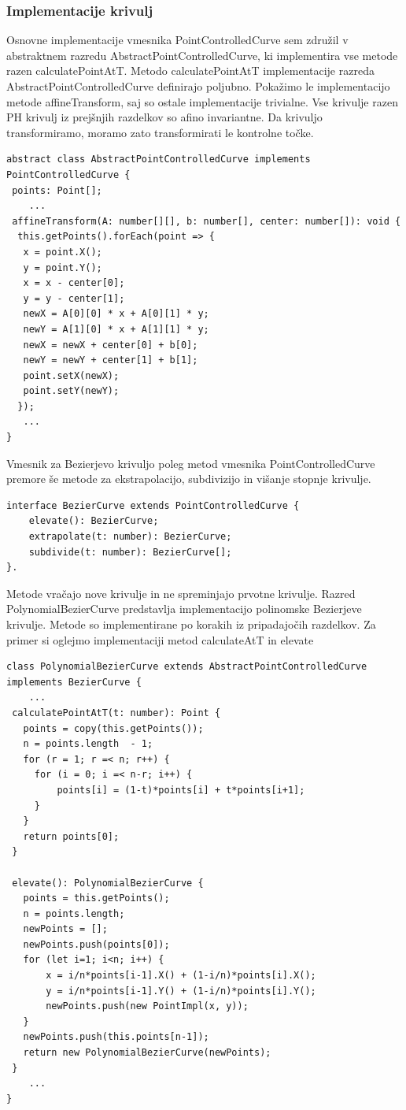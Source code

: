 \documentclass[isrm2, tisk]{fmfdelo}
\begin{document}
    \subsubsection{Implementacije krivulj}
    Osnovne implementacije vmesnika PointControlledCurve sem združil v abstraktnem razredu AbstractPointControlledCurve, ki implementira vse metode razen calculatePointAtT\@.
    Metodo calculatePointAtT implementacije razreda AbstractPointControlledCurve definirajo poljubno.
    Pokažimo le implementacijo metode affineTransform, saj so ostale implementacije trivialne.
    Vse krivulje razen PH krivulj iz prejšnjih razdelkov so afino invariantne.
    Da krivuljo transformiramo, moramo zato transformirati le kontrolne točke.
    \begin{lstlisting}[label={lst:affine-transform}]
abstract class AbstractPointControlledCurve implements PointControlledCurve {
 points: Point[];
    ...
 affineTransform(A: number[][], b: number[], center: number[]): void {
  this.getPoints().forEach(point => {
   x = point.X();
   y = point.Y();
   x = x - center[0];
   y = y - center[1];
   newX = A[0][0] * x + A[0][1] * y;
   newY = A[1][0] * x + A[1][1] * y;
   newX = newX + center[0] + b[0];
   newY = newY + center[1] + b[1];
   point.setX(newX);
   point.setY(newY);
  });
   ...
}
    \end{lstlisting}
    Vmesnik za Bezierjevo krivuljo poleg metod vmesnika PointControlledCurve premore še metode za ekstrapolacijo, subdivizijo in višanje stopnje krivulje.
    \begin{lstlisting}[label={lst:bez-curve-vmesnik}]
interface BezierCurve extends PointControlledCurve {
    elevate(): BezierCurve;
    extrapolate(t: number): BezierCurve;
    subdivide(t: number): BezierCurve[];
}.
    \end{lstlisting}
    Metode vračajo nove krivulje in ne spreminjajo prvotne krivulje.
    Razred PolynomialBezierCurve predstavlja implementacijo polinomske Bezierjeve krivulje.
    Metode so implementirane po korakih iz pripadajočih razdelkov.
    Za primer si oglejmo implementaciji metod calculateAtT in elevate
    \begin{lstlisting}[label={lst:bez-curve}]
class PolynomialBezierCurve extends AbstractPointControlledCurve implements BezierCurve {
    ...
 calculatePointAtT(t: number): Point {
   points = copy(this.getPoints());
   n = points.length  - 1;
   for (r = 1; r =< n; r++) {
     for (i = 0; i =< n-r; i++) {
         points[i] = (1-t)*points[i] + t*points[i+1];
     }
   }
   return points[0];
 }

 elevate(): PolynomialBezierCurve {
   points = this.getPoints();
   n = points.length;
   newPoints = [];
   newPoints.push(points[0]);
   for (let i=1; i<n; i++) {
       x = i/n*points[i-1].X() + (1-i/n)*points[i].X();
       y = i/n*points[i-1].Y() + (1-i/n)*points[i].Y();
       newPoints.push(new PointImpl(x, y));
   }
   newPoints.push(this.points[n-1]);
   return new PolynomialBezierCurve(newPoints);
 }
    ...
}
    \end{lstlisting}
\end{document}
